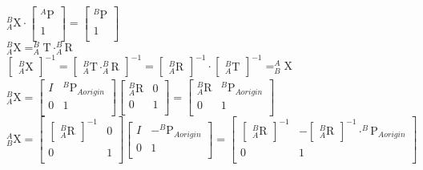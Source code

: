 \documentclass[12pt,fleqn]{standalone}
\begin{document}
\begin{preview}

${\displaystyle _{A}^{B}\textrm{X} \cdot \begin{bmatrix}
		_{}^{A}\textrm{P} \\
		 1 \\
	\end{bmatrix}=\begin{bmatrix}
	_{}^{B}\textrm{P} \\
	1 \\
\end{bmatrix}}$\\
${\displaystyle _{A}^{B}\textrm{X}=_{A}^{B}\textrm{T} \cdot _{A}^{B}\textrm{R}}$\\
${\displaystyle \begin{bmatrix}_{A}^{B}\textrm{X}\end{bmatrix}_{}^{-1}=\begin{bmatrix}_{A}^{B}\textrm{T} \cdot _{A}^{B}\textrm{R}\end{bmatrix}_{}^{-1}=\begin{bmatrix}_{A}^{B}\textrm{R}\end{bmatrix}_{}^{-1} \cdot \begin{bmatrix}_{A}^{B}\textrm{T}\end{bmatrix}_{}^{-1}=_{B}^{A}\textrm{X}}$\\
${\displaystyle _{A}^{B}\textrm{X} =\begin{bmatrix}
I & _{}^{B}\textrm{P}_{A origin}^{} \\
0 & 1 \\
\end{bmatrix}\begin{bmatrix}
_{A}^{B}\textrm{R} & 0 \\
0 & 1 \\
\end{bmatrix}=\begin{bmatrix}
_{A}^{B}\textrm{R} & _{}^{B}\textrm{P}_{A origin}^{} \\
0 & 1 \\
\end{bmatrix}}$ \\
${\displaystyle _{B}^{A}\textrm{X}=\begin{bmatrix}
\begin{bmatrix}
_{A}^{B}\textrm{R}\end{bmatrix}_{}^{-1} &  0\\
0 & 1 \\
\end{bmatrix}\begin{bmatrix}
I & -_{}^{B}\textrm{P}_{A origin}^{} \\
0 & 1 \\
\end{bmatrix}=\begin{bmatrix}
\begin{bmatrix}
_{A}^{B}\textrm{R}\end{bmatrix}_{}^{-1} & -\begin{bmatrix}
_{A}^{B}\textrm{R}\end{bmatrix}_{}^{-1} \cdot _{}^{B}\textrm{P}_{A origin}^{}\\
0 & 1 \\
\end{bmatrix}}
$
\end{preview}
\end{document}
